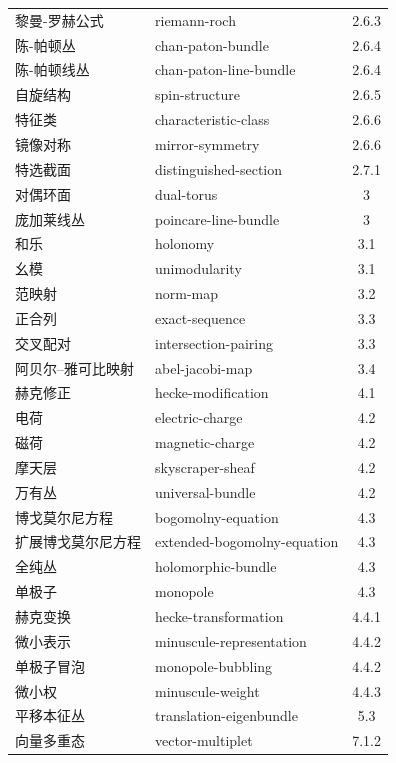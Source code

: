 \begin{longtable}{p{}p{}c}
黎曼-罗赫公式 & riemann-roch & 2.6.3\\
陈-帕顿丛 & chan-paton-bundle & 2.6.4\\
陈-帕顿线丛 & chan-paton-line-bundle & 2.6.4\\
自旋结构 & spin-structure & 2.6.5\\
特征类 & characteristic-class & 2.6.6\\
镜像对称 & mirror-symmetry & 2.6.6\\
特选截面 & distinguished-section & 2.7.1\\
对偶环面 & dual-torus & 3\\
庞加莱线丛 & poincare-line-bundle & 3\\
和乐 & holonomy & 3.1\\
幺模 & unimodularity & 3.1\\
范映射 & norm-map & 3.2\\
正合列 & exact-sequence & 3.3\\
交叉配对 & intersection-pairing & 3.3\\
阿贝尔–雅可比映射 & abel-jacobi-map & 3.4\\
赫克修正 & hecke-modification & 4.1\\
电荷 & electric-charge & 4.2\\
磁荷 & magnetic-charge & 4.2\\
摩天层 & skyscraper-sheaf & 4.2\\
万有丛 & universal-bundle & 4.2\\
博戈莫尔尼方程 & bogomolny-equation & 4.3\\
扩展博戈莫尔尼方程 & extended-bogomolny-equation & 4.3\\
全纯丛 & holomorphic-bundle & 4.3\\
单极子 & monopole & 4.3\\
赫克变换 & hecke-transformation & 4.4.1\\
微小表示 & minuscule-representation & 4.4.2\\
单极子冒泡 & monopole-bubbling & 4.4.2\\
微小权 & minuscule-weight & 4.4.3\\
平移本征丛 & translation-eigenbundle & 5.3\\
向量多重态 & vector-multiplet & 7.1.2\\
\end{longtable}
